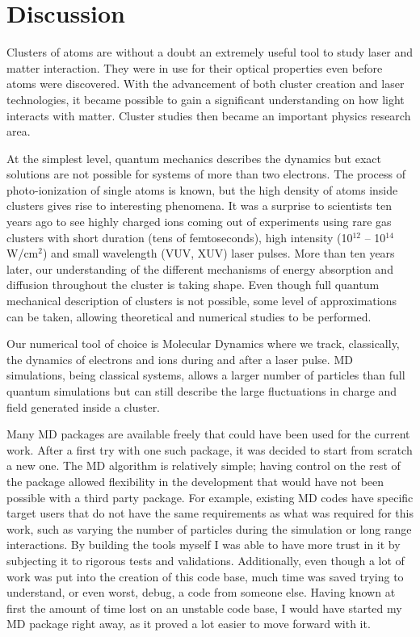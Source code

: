 \section{Discussion}

Clusters of atoms are without a doubt an extremely useful tool to study
laser and matter interaction. They were in use for their optical properties
even before atoms were discovered. With the advancement of both cluster creation
and laser technologies, it became possible to gain a significant understanding
on how light interacts with matter. Cluster studies then became an important
physics research area.

At the simplest level, quantum mechanics describes the dynamics but exact solutions
are not possible for systems of more than two electrons.
The process of photo-ionization of single atoms is known, but the high density
of atoms inside clusters gives rise to interesting phenomena. It was a surprise
to scientists ten years ago to see highly charged ions coming out of experiments
using rare gas clusters with short duration (tens of femtoseconds), high intensity
(10$^{12}$ -- 10$^{14}$ W/cm$^2$) and small wavelength (VUV, XUV) laser pulses.
More than ten years later, our understanding of the different mechanisms of energy
absorption and diffusion throughout the cluster is taking shape. Even though full
quantum mechanical description of clusters is not possible, some level of approximations
can be taken, allowing theoretical and numerical studies to be performed.

Our numerical tool of choice is Molecular Dynamics where we track, classically,
the dynamics of electrons and ions during and after a laser pulse. MD simulations,
being classical systems, allows a larger number of particles than full quantum
simulations but can still describe the large fluctuations in charge and field
generated inside a cluster.

Many MD packages are available freely that could have been used for
the current work. After a first try with one such package, it was decided to
start from scratch a new one. The MD algorithm is relatively simple; having
control on the rest of the package allowed flexibility in the development that
would have not been possible with a third party package. For example, existing
MD codes have specific target users that do not have the same requirements as what
was required for this work, such as varying the number of particles during the
simulation or long range interactions. By building the tools myself I was able
to have more trust in it by subjecting it to rigorous tests and validations.
Additionally, even though a lot of work was put into the creation of this code
base, much time was saved trying to understand, or even worst, debug, a code from
someone else. Having known at first the amount of time lost on an unstable code
base, I would have started my MD package right away, as it proved a lot easier
to move forward with it.


